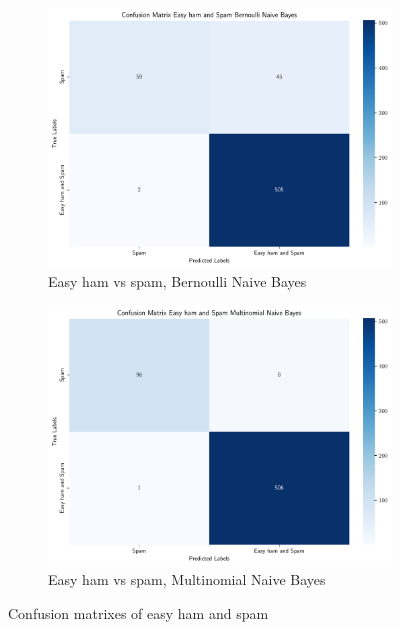 \documentclass[a4paper]{article}
\begin{document}
\begin{figure}
  \centering
  \begin{subfigure}[a]{\textwidth}
      \centering
      \includegraphics[width=\textwidth]{easy_ham_and_spam_bernoulli_naive_bayes_confusion_matrix.pdf}
      \caption{Easy ham vs spam, Bernoulli Naive Bayes}
      \label{fig:easy_ham_and_spam_bernoulli_naive_bayes_confusion_matrix}
  \end{subfigure}
  \vfill
  \begin{subfigure}[b]{\textwidth}
      \centering
      \includegraphics[width=\textwidth]{easy_ham_and_spam_multinomial_naive_bayes_confusion_matrix.pdf}
      \caption{Easy ham vs spam, Multinomial Naive Bayes}
      \label{fig:easy_ham_and_spam_multinomial_naive_bayes_confusion_matrix}
  \end{subfigure}
  \caption{Confusion matrixes of easy ham and spam}
  \label{fig:easy_ham_and_spam_confusion_matrix}
\end{figure}
\end{document}
